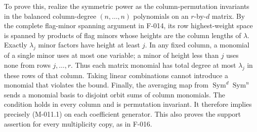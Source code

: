 To prove this, realize the symmetric power as the column-permutation
invariants in the balanced column-degree \((n,\ldots,n)\)
polynomials on an \(r\)-by-\(d\) matrix. By the complete
flag-minor spanning argument in F-014, its row highest-weight
space is spanned by products of flag minors whose heights are
the column lengths of \(\lambda\). Exactly \(\lambda_j\)
minor factors have height at least \(j\). In any fixed column,
a monomial of a single minor uses at most one variable; a minor
of height less than \(j\) uses none from rows \(j,\ldots,r\).
Thus each matrix monomial has total degree at most \(\lambda_j\)
in these rows of that column. Taking linear combinations cannot
introduce a monomial that violates the bound. Finally, the
averaging map from \(\operatorname{Sym}^d\operatorname{Sym}^n\)
sends a monomial basis to disjoint orbit sums of column monomials.
The condition holds in every column and is permutation invariant.
It therefore implies precisely (M-011.1) on each coefficient
generator. This also proves the support assertion for every
multiplicity copy, as in F-016.

